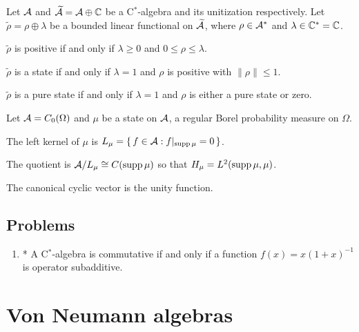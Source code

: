 \documentclass{../../large}
\begin{document}
\begin{prb}
Let $\mathcal{A}$ and $\widetilde{\mathcal{A}}=\mathcal{A}\oplus\mathbb{C}$ be a C$^*$-algebra and its unitization respectively.
Let $\tilde\rho=\rho\oplus\lambda$ be a bounded linear functional on $\widetilde{\mathcal{A}}$, where $\rho\in\mathcal{A}^*$ and $\lambda\in\mathbb{C}^*=\mathbb{C}$.
\begin{parts}
\item $\tilde\rho$ is positive if and only if $\lambda\ge0$ and $0\le\rho\le\lambda$.
\item $\tilde\rho$ is a state if and only if $\lambda=1$ and $\rho$ is positive with $\|\rho\|\le1$.
\item $\tilde\rho$ is a pure state if and only if $\lambda=1$ and $\rho$ is either a pure state or zero.
\end{parts}
\end{prb}


\begin{prb}
Let $\mathcal{A}=C_0(\Omega)$ and $\mu$ be a state on $\mathcal{A}$, a regular Borel probability measure on $\Omega$.
\begin{parts}
\item The left kernel of $\mu$ is $L_\mu=\{\,f\in\mathcal{A}:f|_{\operatorname{supp}\mu}=0\,\}$.
\item The quotient is $\mathcal{A}/L_\mu\cong C(\operatorname{supp}\mu)$ so that $H_\mu=L^2(\operatorname{supp}\mu,\mu)$.
\item The canonical cyclic vector is the unity function.
\end{parts}
\end{prb}

\begin{prb}[Representations of $K(H)$]
\end{prb}



\begin{prb}
\end{prb}


\section*{Problems}
\begin{enumerate}
\item* A C$^*$-algebra is commutative if and only if a function $f(x)=x(1+x)^{-1}$ is operator subadditive.
\end{enumerate}


\chapter{Von Neumann algebras}
\end{document}
